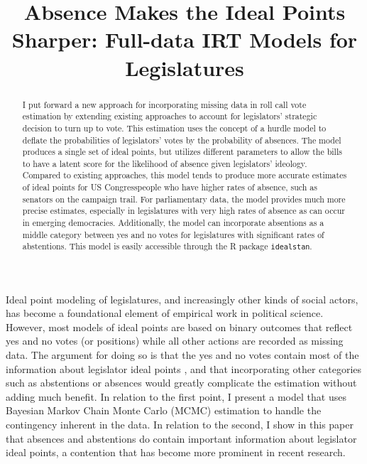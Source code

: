 %

\title{Absence Makes the Ideal Points Sharper: Full-data IRT Models for Legislatures}
\usepackage{amsmath,amsthm, amssymb, latexsym}
\linespread{1.5}

	
	\maketitle
	
	\begin{abstract}
		I put forward a new approach for incorporating missing data in roll call vote estimation by extending existing approaches to account for legislators' strategic decision to turn up to vote. This estimation uses the concept of a hurdle model to deflate the probabilities of legislators' votes by the probability of absences. The model produces a single set of ideal points, but utilizes different parameters to allow the bills to have a latent score for the likelihood of absence given legislators' ideology. Compared to existing approaches, this model tends to produce more accurate estimates of ideal points for US Congresspeople who have higher rates of absence, such as senators on the campaign trail. For parliamentary data, the model provides much more precise estimates, especially in legislatures with very high rates of absence as can occur in emerging democracies. Additionally, the model can incorporate absentions as a middle category between yes and no votes for legislatures with significant rates of abstentions. This model is easily accessible through the R package \texttt{idealstan}.
	\end{abstract}
	
	Ideal point modeling of legislatures, and increasingly other kinds of social actors, has become a foundational element of empirical work in political science. However, most models of ideal points are based on binary outcomes that reflect yes and no votes (or positions) while all other actions are recorded as missing data. The argument for doing so is that the yes and no votes contain most of the information about legislator ideal points \parencite{poole2008}, and that incorporating other categories such as abstentions or absences would greatly complicate the estimation without adding much benefit. In relation to the first point, I present a model that uses Bayesian Markov Chain Monte Carlo (MCMC) estimation to handle the contingency inherent in the data. In relation to the second, I show in this paper that absences and abstentions do contain important information about legislator ideal points, a contention that has become more prominent in recent research.
	
